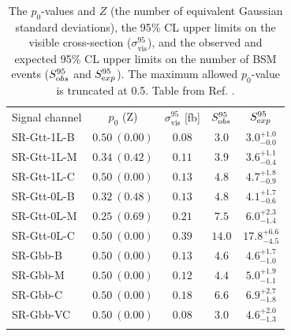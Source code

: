 \begin{table}[htbp]
        \centering
        \small
        \begin{tabular*}{0.6\textwidth}{@{\extracolsep{\fill}}lcccc}
                \noalign{\smallskip}\toprule\noalign{\smallskip}
                Signal channel         & $p_0$ (Z)            & $\sigma^{95}_\mathrm{vis}$ [fb]  &  $S_{\textrm obs}^{95}$  & $S_{\textrm exp}^{95}$   \\
                \noalign{\smallskip}\midrule \noalign{\smallskip}
                SR-Gtt-1L-B & $ 0.50~(0.00) $ &  $0.08$ &  $3.0$ & $ { 3.0 }^{ +1.0 }_{ -0.0 }$ \\[1mm]
                SR-Gtt-1L-M & $ 0.34~(0.42)$ &  $0.11$ &  $3.9$ & $ { 3.6 }^{ +1.1 }_{ -0.4 }$ \\[1mm]
                SR-Gtt-1L-C & $ 0.50~(0.00)$ &  $0.13$ &  $4.8$ & $ { 4.7 }^{ +1.8 }_{ -0.9 }$ \\[1mm]
                \noalign{\smallskip}\midrule \noalign{\smallskip}
                SR-Gtt-0L-B & $ 0.32~(0.48)$ & $0.13$ &  $4.8$ & $ { 4.1 }^{ +1.7 }_{ -0.6 }$  \\[1mm]
                SR-Gtt-0L-M & $ 0.25~(0.69)$ &  $0.21$ &  $7.5$ & $ { 6.0 }^{ +2.3 }_{ -1.4 }$ \\[1mm]
                SR-Gtt-0L-C & $ 0.50~(0.00)$ &  $0.39$ &  $14.0$ & $ { 17.8 }^{ +6.6 }_{ -4.5 }$ \\[1mm] %
                \noalign{\smallskip}\midrule\noalign{\smallskip}
                SR-Gbb-B & $ 0.50~(0.00) $ &  $0.13$ &  $4.6$ & $ { 4.6 }^{ +1.7 }_{ -1.0 }$  \\[1mm]
                SR-Gbb-M & $ 0.50~(0.00) $ & $0.12$ &  $4.4$ & $ { 5.0 }^{ +1.9 }_{ -1.1 }$ \\[1mm]
                SR-Gbb-C & $ 0.50~(0.00) $ &  $0.18$ &  $6.6$ & $ { 6.9 }^{ +2.7 }_{ -1.8 }$ \\[1mm]
                SR-Gbb-VC & $ 0.50~(0.00) $ &  $0.08$ &  $3.0$ & $ { 4.6 }^{ +2.0 }_{ -1.3 }$\\
                \noalign{\smallskip}\midrule\noalign{\smallskip}
        \end{tabular*}
                \caption{The $p_0$-values and $Z$ (the number of equivalent Gaussian standard deviations), 
        	the 95$\%$ CL upper limits on the visible cross-section
                ($\sigma^{95}_\mathrm{vis}$),
                and the observed and
                expected 95$\%$ CL upper limits on the number of BSM events ($S_{\textrm
                obs}^{95}$ and $S_{\textrm exp}^{95}$). The maximum
              allowed $p_0$-value
              is truncated at 0.5.  Table from Ref. \cite{Aaboud:2017hrg}.}
        \label{mod-ind-lim}
\end{table}

